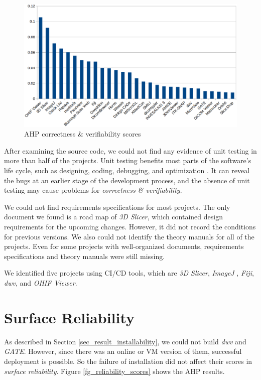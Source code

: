 \begin{figure}[H]
\includegraphics[scale=0.38]{figures/correctness_verifiability_scores.png}
\caption{AHP correctness \& verifiability scores}
\label{fg_correctness_erifiability_scores}
\end{figure}

After examining the source code, we could not find any evidence of unit testing in more than half of the projects. Unit testing benefits most parts of the software's life cycle, such as designing, coding, debugging, and optimization \cite{Hamill2004}. It can reveal the bugs at an earlier stage of the development process, and the absence of unit testing may cause problems for \textit{correctness \& verifiability}.

We could not find requirements specifications for most projects. The only document we found is a road map of \textit{3D Slicer}, which contained design requirements for the upcoming changes. However, it did not record the conditions for previous versions. We also could not identify the theory manuals for all of the projects. Even for some projects with well-organized documents, requirements specifications and theory manuals were still missing.

We identified five projects using CI/CD tools, which are \textit{3D Slicer}, \textit{ImageJ
}, \textit{Fiji}, \textit{dwv}, and \textit{OHIF Viewer}.

\section{Surface Reliability}
As described in Section \ref{sec_result_installability}, we could not build \textit{dwv} and \textit{GATE}. However, since there was an online or VM version of them, successful deployment is possible. So the failure of installation did not affect their scores in \textit{surface reliability}. Figure \ref{fg_reliability_scores} shows the AHP results.

